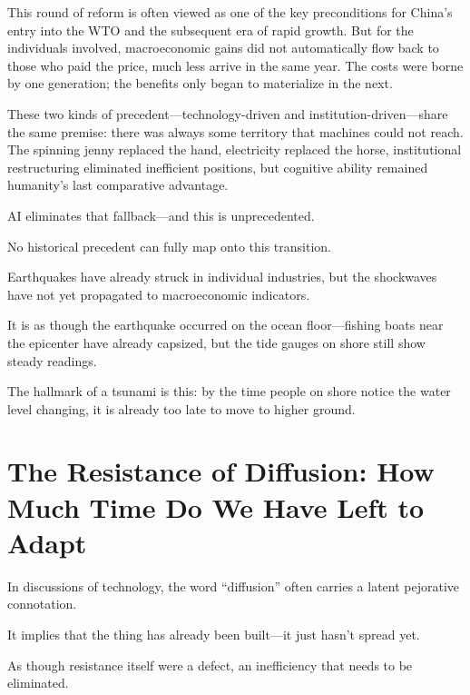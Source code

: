 \vspace{1em}

This round of reform is often viewed as one of the key preconditions for China's entry into the WTO and the subsequent era of rapid growth. But for the individuals involved, macroeconomic gains did not automatically flow back to those who paid the price, much less arrive in the same year.
The costs were borne by one generation; the benefits only began to materialize in the next.

\vspace{1em}

These two kinds of precedent---technology-driven and institution-driven---share the same premise: there was always some territory that machines could not reach. The spinning jenny replaced the hand, electricity replaced the horse, institutional restructuring eliminated inefficient positions, but cognitive ability remained humanity's last comparative advantage.

\vspace{1em}

AI eliminates that fallback---and this is unprecedented.

No historical precedent can fully map onto this transition.

\vspace{1em}

Earthquakes have already struck in individual industries, but the shockwaves have not yet propagated to macroeconomic indicators.

It is as though the earthquake occurred on the ocean floor---fishing boats near the epicenter have already capsized, but the tide gauges on shore still show steady readings.

The hallmark of a tsunami is this: by the time people on shore notice the water level changing, it is already too late to move to higher ground.

\newpage
\section{The Resistance of Diffusion: How Much Time Do We Have Left to Adapt}
In discussions of technology, the word ``diffusion'' often carries a latent pejorative connotation.

It implies that the thing has already been built---it just hasn't spread yet.

As though resistance itself were a defect, an inefficiency that needs to be eliminated.

